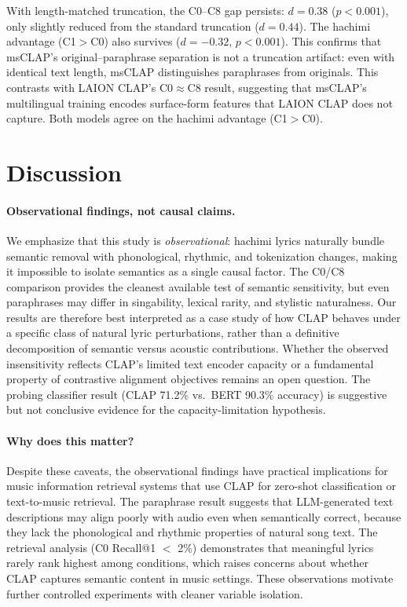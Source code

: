 \documentclass[11pt]{article}
\begin{document}
With length-matched truncation, the C0--C8 gap persists: $d{=}0.38$ ($p{<}0.001$), only slightly reduced from the standard truncation ($d{=}0.44$). The hachimi advantage (C1${>}$C0) also survives ($d{=}{-}0.32$, $p{<}0.001$). This confirms that msCLAP's original--paraphrase separation is not a truncation artifact: even with identical text length, msCLAP distinguishes paraphrases from originals. This contrasts with LAION CLAP's C0$\approx$C8 result, suggesting that msCLAP's multilingual training encodes surface-form features that LAION CLAP does not capture. Both models agree on the hachimi advantage (C1${>}$C0).

\section{Discussion}\label{sec:discussion}

\paragraph{Observational findings, not causal claims.}
We emphasize that this study is \emph{observational}: hachimi lyrics naturally bundle semantic removal with phonological, rhythmic, and tokenization changes, making it impossible to isolate semantics as a single causal factor. The C0/C8 comparison provides the cleanest available test of semantic sensitivity, but even paraphrases may differ in singability, lexical rarity, and stylistic naturalness. Our results are therefore best interpreted as a case study of how CLAP behaves under a specific class of natural lyric perturbations, rather than a definitive decomposition of semantic versus acoustic contributions. Whether the observed insensitivity reflects CLAP's limited text encoder capacity or a fundamental property of contrastive alignment objectives remains an open question. The probing classifier result (CLAP 71.2\% vs.\ BERT 90.3\% accuracy) is suggestive but not conclusive evidence for the capacity-limitation hypothesis.

\paragraph{Why does this matter?}
Despite these caveats, the observational findings have practical implications for music information retrieval systems that use CLAP for zero-shot classification or text-to-music retrieval. The paraphrase result suggests that LLM-generated text descriptions may align poorly with audio even when semantically correct, because they lack the phonological and rhythmic properties of natural song text. The retrieval analysis (C0 Recall@1 $<$ 2\%) demonstrates that meaningful lyrics rarely rank highest among conditions, which raises concerns about whether CLAP captures semantic content in music settings. These observations motivate further controlled experiments with cleaner variable isolation.
\end{document}
